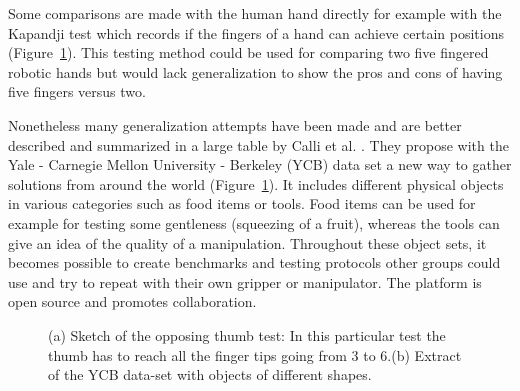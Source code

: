  
 Some comparisons are made with the human hand directly \cite{deimel2016novel} for example with the Kapandji test \cite{kapandji1986clinical} which records if the fingers of a hand can achieve certain positions (Figure~\ref{f:Other Testing}). This testing method could be used for comparing two five fingered robotic hands but would lack generalization to show the pros and cons of having five fingers versus two. 

 
 Nonetheless many generalization attempts have been made and are better described and summarized in a large table by Calli et al. \cite{calli2015benchmarking}. They propose with the Yale - Carnegie Mellon University - Berkeley (YCB) data set a new way to gather  solutions from around the world (Figure~\ref{f:Other Testing}). It includes different physical objects in various categories such as food items or tools. Food items can be used for example for testing some gentleness (squeezing of a fruit), whereas the tools can give an idea of the quality of a manipulation. Throughout these object sets, it becomes possible to create benchmarks and testing protocols other groups could use and try to repeat with their own gripper or manipulator. The platform is open source and promotes collaboration.
 \begin{figure}[ht]
\centering
{}\quad
{}\quad
\caption[Other Testing]{\label{f:Other Testing} (a) Sketch of the opposing thumb test: In this particular test the thumb has to reach all the finger tips going from 3 to 6.(b) Extract of the YCB data-set with objects of different shapes.}
\end{figure}












